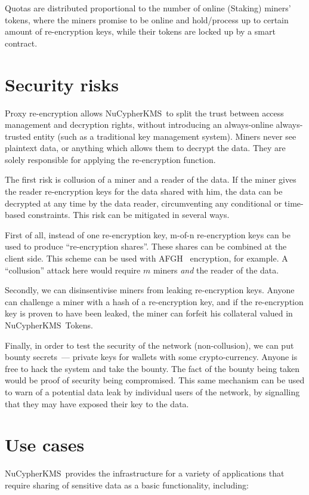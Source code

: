 \documentclass[notitlepage,longbibliography]{revtex4-1}
\newcommand{\kms}{NuCypherKMS}
\begin{document}
Quotas are distributed proportional to the number of online (Staking) miners' tokens,
where the miners promise to be online and hold/process up to certain amount of re-encryption keys,
while their tokens are locked up by a smart contract.

\section{Security risks}

Proxy re-encryption allows \kms~to split the trust between access management and decryption rights,
without introducing an always-online always-trusted entity (such as a traditional key management system).
Miners never see plaintext data, or anything which allows them to decrypt the data.
They are solely responsible for applying the re-encryption function.

The first risk is collusion of a miner and a reader of the data.
If the miner gives the reader re-encryption keys for the data shared with him,
the data can be decrypted at any time by the data reader, circumventing any conditional or time-based constraints.
This risk can be mitigated in several ways.

First of all, instead of one re-encryption key, m-of-n re-encryption keys can be used to produce ``re-encryption shares''.
These shares can be combined at the client side.
This scheme can be used with AFGH~\cite{AFGH} encryption, for example.
A ``collusion'' attack here would require $m$ miners \emph{and} the reader of the data.

Secondly, we can disinsentivise miners from leaking re-encryption keys.
Anyone can challenge a miner with a hash of a re-encryption key, and if the re-encryption key is proven to have been leaked, the miner can forfeit his collateral valued in \kms~Tokens.

Finally, in order to test the security of the network (non-collusion), we can put bounty secrets~--- private keys for wallets with
some crypto-currency.
Anyone is free to hack the system and take the bounty.
The fact of the bounty being taken would be proof of security being compromised.
This same mechanism can be used to warn of a potential data leak by individual users of the network, by signalling that they may have exposed
their key to the data.

\section{Use cases}
\kms~provides the infrastructure for a variety of applications that require sharing of sensitive data as a basic
functionality, including:
\end{document}
